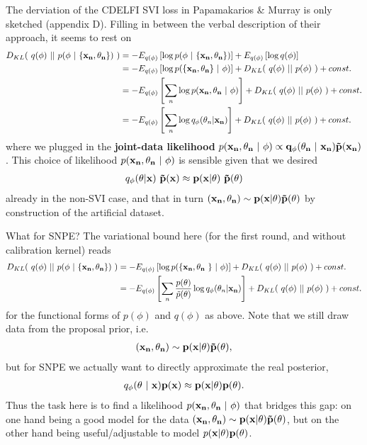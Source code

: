 \documentclass[10pt,english]{article}
\begin{document}
The derviation of the CDELFI SVI loss in Papamakarios \& Murray is only sketched (appendix D). 
Filling in between the verbal description of their approach, it seems to rest on 
\begin{align}
D_{KL}( \ q(\phi) \ || \ p(\phi \ | \ \{\bf{x}_n, \theta_n\}) \ ) &= - E_{q(\phi)}\left[ \log p(\phi \ | \ \{\bf{x}_n, \theta_n\}) \right]  + E_{q(\phi)}\left[ \log q(\phi) \right] \nonumber \\
&= - E_{q(\phi)}\left[ \log p( \{\bf{x}_n, \theta_n\} \ | \ \phi) \right]  + D_{KL}( \ q(\phi) \ || \ p(\phi) \ )  + const. \nonumber \\
&= - E_{q(\phi)}\left[ \sum_n \log p( \bf{x}_n, \theta_n \ | \ \phi) \right]  + D_{KL}( \ q(\phi) \ || \ p(\phi) \ )  + const. \nonumber \\
&= - E_{q(\phi)}\left[ \sum_n \log q_\phi( \theta_n | \bf{x}_n) \right]  + D_{KL}( \ q(\phi) \ || \ p(\phi) \ )  + const. \nonumber
\end{align}
where we plugged in the \textbf{joint-data likelihood} $p( \bf{x}_n, \theta_n \ | \ \phi) \propto q_\phi(\theta_n \ | \ \bf{x}_n) \tilde{p}(\bf{x}_n)$. 
This choice of likelihood $p( \bf{x}_n, \theta_n \ | \ \phi)$ is sensible given that we desired
\begin{align}
q_\phi(\theta | \bf{x}) \ \tilde{p}(\bf{x}) \approx p(x |\theta) \ \tilde{p}(\theta) \nonumber
\end{align}
already in the non-SVI case, and that in turn $(\bf{x}_n, \theta_n) \sim p(x|\theta)\tilde{p}(\theta)$ by construction of the artificial dataset.



\noindent{}What for SNPE? The variational bound here (for the first round, and without calibration kernel) reads 
\begin{align}
D_{KL}( \ q(\phi) \ || \ p(\phi \ | \ \{\bf{x}_n, \theta_n\}) \ ) &= - E_{q(\phi)}\left[ \log p( \{ \bf{x}_n, \theta_n \ \} \ | \ \phi) \right]  + D_{KL}( \ q(\phi) \ || \ p(\phi) \ )  + const. \nonumber \\
&= - E_{q(\phi)}\left[ \sum_n \frac{p(\theta)}{\tilde{p}(\theta)}\log q_\phi( \theta_n | \bf{x}_n) \right]  + D_{KL}( \ q(\phi) \ || \ p(\phi) \ )  + const. \nonumber
\end{align}
for the functional forms of $p(\phi)$ and $q(\phi)$ as above.
Note that we still draw data from the proposal prior, i.e.
\begin{align}
(\bf{x}_n, \theta_n) \sim p(x|\theta)\tilde{p}(\theta),\nonumber
\end{align} 
but for SNPE we actually want to directly approximate the real posterior,
\begin{align}
q_\phi(\theta \ | \ \bf{x}) p(\bf{x}) \approx p(x |\theta) p(\theta). \nonumber
\end{align}
Thus the task here is to find a likelihood $p( \bf{x}_n, \theta_n \ | \ \phi)$ that bridges this gap: 
on one hand being a good model for the data $(\bf{x}_n, \theta_n) \sim p(\bf{x}|\theta)\tilde{p}(\theta)$, but on the other hand being useful/adjustable to model $p(\bf{x} |\theta) p(\theta)$.
\end{document}
